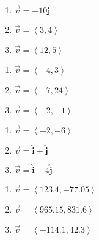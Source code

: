 \documentclass{ximera}
\begin{document}
\begin{multicols}{3}

\begin{enumerate}

\setcounter{enumi}{\value{HW}}

\item  $\vec{v} = -10 \bm\hat{\text{j}}$
\item  $\vec{v} = \left< 3,4\right>$
\item  $\vec{v} = \left<12, 5\right>$

\setcounter{HW}{\value{enumi}}

\end{enumerate}

\end{multicols}

\begin{multicols}{3}

\begin{enumerate}

\setcounter{enumi}{\value{HW}}

\item $\vec{v} = \left<-4, 3 \right>$
\item  $\vec{v} = \left<-7, 24\right>$
\item $\vec{v} = \left<-2, -1 \right>$

\setcounter{HW}{\value{enumi}}

\end{enumerate}

\end{multicols}

\begin{multicols}{3}

\begin{enumerate}

\setcounter{enumi}{\value{HW}}

\item  $\vec{v} = \left<-2, -6\right>$
\item  $\vec{v} = \bm\hat{\text{i}} + \bm\hat{\text{j}}$
\item  $\vec{v} = \bm\hat{\text{i}} - 4\bm\hat{\text{j}}$

\setcounter{HW}{\value{enumi}}

\end{enumerate}

\end{multicols}

\begin{multicols}{3}

\begin{enumerate}

\setcounter{enumi}{\value{HW}}

\item  $\vec{v} = \left<123.4, -77.05\right>$
\item  $\vec{v} = \left<965.15, 831.6\right>$
\item  $\vec{v} = \left<-114.1, 42.3\right>$ \label{findmaganglelast}

\setcounter{HW}{\value{enumi}}

\end{enumerate}

\end{multicols}
\end{document}
